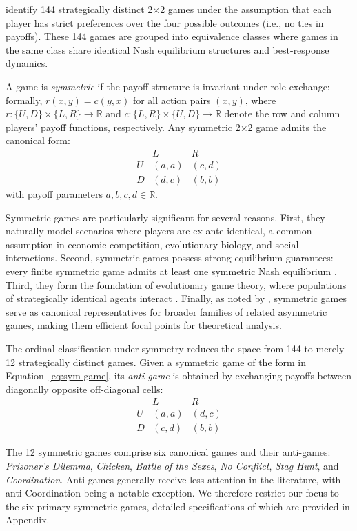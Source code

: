 \documentclass[11pt]{amsart}
\begin{document}
\citet{top} identify 144 strategically distinct 2×2 games under the assumption that each player has strict preferences over the four possible outcomes (i.e., no ties in payoffs). These 144 games are grouped into equivalence classes where games in the same class share identical Nash equilibrium structures and best-response dynamics.

A game is \textit{symmetric} if the payoff structure is invariant under role exchange: formally, $r(x, y) = c(y, x)$ for all action pairs $(x,y)$, where $r: \{U,D\} \times \{L,R\} \to \mathbb{R}$ and $c: \{L,R\} \times \{U,D\} \to \mathbb{R}$ denote the row and column players' payoff functions, respectively. Any symmetric 2×2 game admits the canonical form:
\begin{equation} \label{eq:sym-game}
\begin{array}{c|c|c}
  & L & R \\
\hline
U & (a, a) & (c, d) \\
\hline
D & (d, c) & (b, b)
\end{array}
\end{equation}
with payoff parameters $a, b, c, d \in \mathbb{R}$.

Symmetric games are particularly significant for several reasons. First, they naturally model scenarios where players are ex-ante identical, a common assumption in economic competition, evolutionary biology, and social interactions. Second, symmetric games possess strong equilibrium guarantees: every finite symmetric game admits at least one symmetric Nash equilibrium \citep{nash2024non}. Third, they form the foundation of evolutionary game theory, where populations of strategically identical agents interact \citep{smith1982evolution}. Finally, as noted by \citet{top}, symmetric games serve as canonical representatives for broader families of related asymmetric games, making them efficient focal points for theoretical analysis.

The ordinal classification under symmetry reduces the space from 144 to merely 12 strategically distinct games. Given a symmetric game of the form in Equation~\ref{eq:sym-game}, its \textit{anti-game} is obtained by exchanging payoffs between diagonally opposite off-diagonal cells:
\begin{equation}
\begin{array}{c|c|c}
  & L & R \\
\hline
U & (a, a) & (d, c) \\
\hline
D & (c, d) & (b, b)
\end{array}
\end{equation}

The 12 symmetric games comprise six canonical games and their anti-games: \textit{Prisoner's Dilemma}, \textit{Chicken}, \textit{Battle of the Sexes}, \textit{No Conflict}, \textit{Stag Hunt}, and \textit{Coordination}. Anti-games generally receive less attention in the literature, with anti-Coordination being a notable exception. We therefore restrict our focus to the six primary symmetric games, detailed specifications of which are provided in Appendix.





\end{document}
